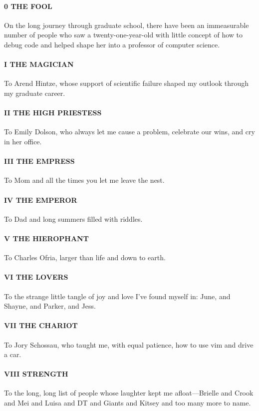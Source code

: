 \paragraph{0 THE FOOL} On the long journey through graduate school, there have been an immeasurable number of people who saw a twenty-one-year-old with little concept of how to debug code and helped shape her into a professor of computer science.

\paragraph{I THE MAGICIAN} To Arend Hintze, whose support of scientific failure shaped my outlook through my graduate career. 

\paragraph{II THE HIGH PRIESTESS} To Emily Dolson, who always let me cause a problem, celebrate our wins, and cry in her office.

\paragraph{III THE EMPRESS} To Mom and all the times you let me leave the nest.

\paragraph{IV THE EMPEROR} To Dad and long summers filled with riddles.

\paragraph{V THE HIEROPHANT} To Charles Ofria, larger than life and down to earth.

\paragraph{VI THE LOVERS} To the strange little tangle of joy and love I've found myself in: June, and Shayne, and Parker, and Jess. 

\paragraph{VII THE CHARIOT} To Jory Schossau, who taught me, with equal patience, how to use vim and drive a car.

\paragraph{VIII STRENGTH} To the long, long list of people whose laughter kept me afloat---Brielle and Crook and Mei and Luisa and DT and Giants and Kitsey and too many more to name. 

